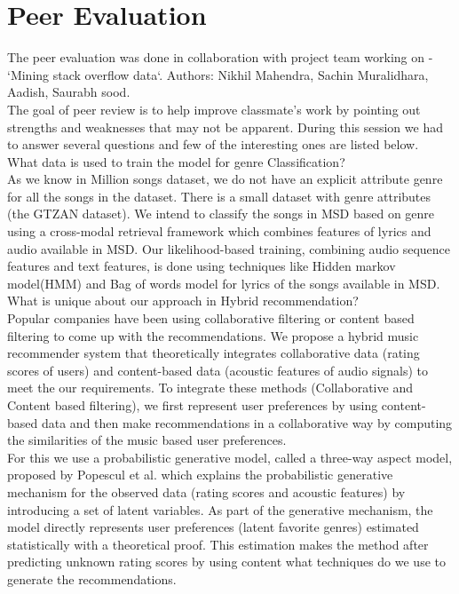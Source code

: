 \documentclass{sig-alternate-05-2015}
\begin{document}
\section{Peer Evaluation}

The peer evaluation was done in collaboration with project team working on - `Mining stack overflow data`. Authors: Nikhil Mahendra, Sachin Muralidhara, Aadish, Saurabh sood.\\

The goal of peer review is to help improve classmate's work by pointing out strengths and weaknesses that may not be apparent. During this session we had to answer several questions and few of the interesting ones are listed below.\\

What data is used to train the model for genre Classification? \\

As we know in Million songs dataset, we do not have an explicit attribute genre for all the songs in the dataset. There is a small dataset with genre attributes (the GTZAN dataset). We intend to classify the songs in MSD based on genre using a cross-modal retrieval framework which combines features of lyrics and audio available in MSD. Our likelihood-based training, combining audio sequence features and text features, is done using techniques like Hidden markov model(HMM) and Bag of words model for lyrics of the songs available in MSD.\\

What is unique about our approach in Hybrid recommendation? \\

Popular companies have been using collaborative filtering or content based filtering to come up with the recommendations. We propose a hybrid music recommender system that theoretically integrates collaborative data (rating scores of users) and content-based data (acoustic features of audio signals) to meet the our requirements. To integrate these methods (Collaborative and Content based filtering), we first represent user preferences by using content-based data and then make recommendations in a collaborative way by computing the similarities of the music based user preferences.\\

For this we use a probabilistic generative model, called a three-way aspect model, proposed by Popescul et al. which explains the probabilistic generative mechanism for the observed data (rating scores and acoustic features) by introducing a set of latent variables. As part of the generative mechanism, the model directly represents user preferences (latent favorite genres) estimated statistically with a theoretical proof. This estimation makes the method after predicting unknown rating scores by using content what techniques do we use to generate the recommendations.\\
\end{document}
